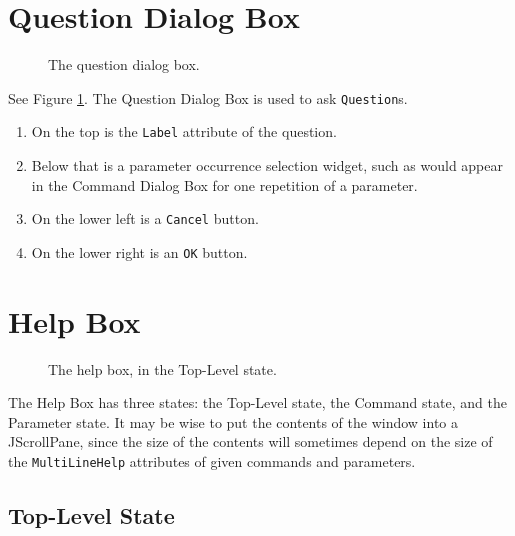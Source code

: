 \documentclass[11pt]{article}
\begin{document}
\section{Question Dialog Box}

\begin{figure}

\centerline{\epsfxsize=3in }

\caption{
  The question dialog box.
}
\label{questionDialogBoxFig}
\end{figure}

See Figure \ref{questionDialogBoxFig}.  The Question Dialog Box
is used to ask {\tt Question}s.
\begin{enumerate}
\item On the top is the {\tt Label} attribute of the question.
\item Below that is a parameter occurrence selection widget, such as
  would appear in the Command Dialog Box for one repetition of a parameter.
\item On the lower left is a {\tt Cancel} button.
\item On the lower right is an {\tt OK} button.
\end{enumerate}

\section{Help Box}

\begin{figure}

\centerline{\epsfxsize=4in }

\caption{
  The help box, in the Top-Level state.
}
\label{helpBox01Fig}
\end{figure}

The Help Box has three states: the Top-Level state, the Command state, and
the Parameter state.  It may be wise to put the contents of the window
into a JScrollPane, since the size of the contents will sometimes depend
on the size of the {\tt MultiLineHelp} attributes of given commands and
parameters.

\subsection{Top-Level State}
\end{document}
